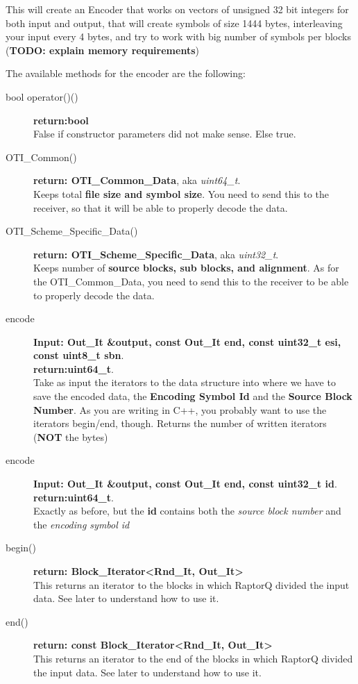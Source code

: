 \documentclass[11pt,a4paper]{refart}
\begin{document}
This will create an Encoder that works on vectors of unsigned 32 bit integers for both input and output, that will create symbols of size 1444 bytes, interleaving
your input every 4 bytes, and try to work with big number of symbols per blocks (\textbf{TODO: explain memory requirements})

The available methods for the encoder are the following:

\begin{description}
\item[bool operator()()] \textbf{return:bool}\\
False if constructor parameters did not make sense. Else true.

\item[OTI\_Common()] \textbf{return: OTI\_Common\_Data}, aka \textit{uint64\_t}.\\
Keeps total \textbf{file size and symbol size}. You need to send this to the receiver, so that it will be able to properly decode the data.

\item[OTI\_Scheme\_Specific\_Data()] \textbf{return: OTI\_Scheme\_Specific\_Data}, aka \textit{uint32\_t}.\\
Keeps number of \textbf{source blocks, sub blocks, and alignment}. As for the OTI\_Common\_Data, you need to send this to the receiver to be able to
properly decode the data.

\item[encode] \textbf{Input: Out\_It \&output, const Out\_It end, const uint32\_t esi, const uint8\_t sbn}.\\
\textbf{return:uint64\_t}.\\
Take as input the iterators to the data structure into where we have to save the encoded data, the \textbf{Encoding Symbol Id} and the
\textbf{Source Block Number}. As you are writing in C++, you probably want to use the iterators begin/end, though. Returns the number of written
iterators (\textbf{NOT} the bytes)

\item[encode] \textbf{Input: Out\_It \&output, const Out\_It end, const uint32\_t id}.\\
\textbf{return:uint64\_t}.\\
Exactly as before, but the \textbf{id} contains both the \textit{source block number} and the \textit{encoding symbol id}

\item[begin()] \textbf{return: Block\_Iterator<Rnd\_It, Out\_It>}\\
This returns an iterator to the blocks in which RaptorQ divided the input data. See later to understand how to use it.
\item[end()] \textbf{return: const Block\_Iterator<Rnd\_It, Out\_It>}\\
This returns an iterator to the end of the blocks in which RaptorQ divided the input data. See later to understand how to use it.


\end{description}
\end{document}
